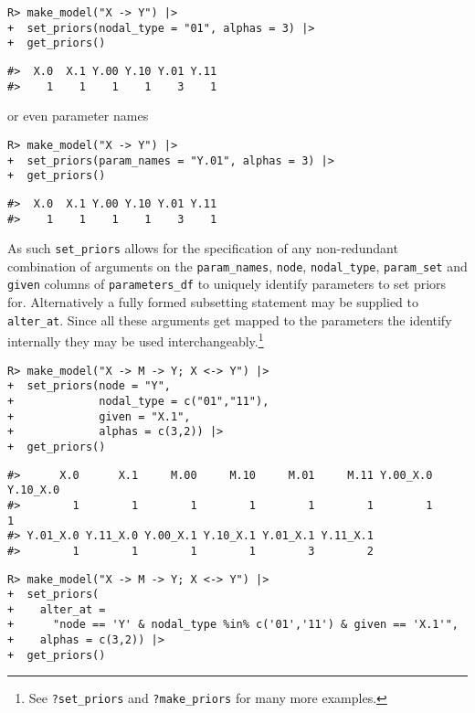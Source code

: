 \documentclass[
  11pt,
  article]{jss}
\begin{document}
\begin{verbatim}
R> make_model("X -> Y") |>
+  set_priors(nodal_type = "01", alphas = 3) |>
+  get_priors()
\end{verbatim}

\begin{verbatim}
#>  X.0  X.1 Y.00 Y.10 Y.01 Y.11 
#>    1    1    1    1    3    1
\end{verbatim}

or even parameter names

\begin{verbatim}
R> make_model("X -> Y") |>
+  set_priors(param_names = "Y.01", alphas = 3) |>
+  get_priors()
\end{verbatim}

\begin{verbatim}
#>  X.0  X.1 Y.00 Y.10 Y.01 Y.11 
#>    1    1    1    1    3    1
\end{verbatim}

As such \texttt{set\_priors} allows for the specification of any
non-redundant combination of arguments on the \texttt{param\_names},
\texttt{node}, \texttt{nodal\_type}, \texttt{param\_set} and
\texttt{given} columns of \texttt{parameters\_df} to uniquely identify
parameters to set priors for. Alternatively a fully formed subsetting
statement may be supplied to \texttt{alter\_at}. Since all these
arguments get mapped to the parameters the identify internally they may
be used interchangeably.\footnote{See \texttt{?set\_priors} and
  \texttt{?make\_priors} for many more examples.}

\begin{verbatim}
R> make_model("X -> M -> Y; X <-> Y") |>
+  set_priors(node = "Y", 
+             nodal_type = c("01","11"), 
+             given = "X.1", 
+             alphas = c(3,2)) |>
+  get_priors()
\end{verbatim}

\begin{verbatim}
#>      X.0      X.1     M.00     M.10     M.01     M.11 Y.00_X.0 Y.10_X.0 
#>        1        1        1        1        1        1        1        1 
#> Y.01_X.0 Y.11_X.0 Y.00_X.1 Y.10_X.1 Y.01_X.1 Y.11_X.1 
#>        1        1        1        1        3        2
\end{verbatim}

\begin{verbatim}
R> make_model("X -> M -> Y; X <-> Y") |>
+  set_priors(
+    alter_at = 
+      "node == 'Y' & nodal_type %in% c('01','11') & given == 'X.1'", 
+    alphas = c(3,2)) |>
+  get_priors()
\end{verbatim}
\end{document}

